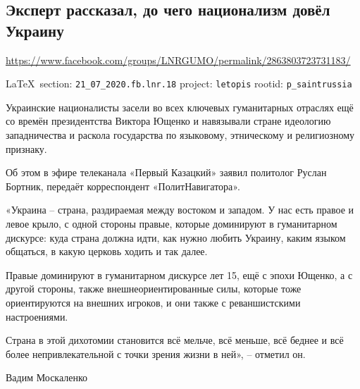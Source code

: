  
 
  
\subsection{Эксперт рассказал, до чего национализм довёл Украину}
\url{https://www.facebook.com/groups/LNRGUMO/permalink/2863803723731183/}

\vspace{0.5cm}
{\small\LaTeX~section: \verb|21_07_2020.fb.lnr.18| project: \verb|letopis| rootid: \verb|p_saintrussia|}
\vspace{0.5cm}

Украинские националисты засели во всех ключевых гуманитарных отраслях ещё со
времён президентства Виктора Ющенко и навязывали стране идеологию западничества
и раскола государства по языковому, этническому и религиозному признаку.

Об этом в эфире телеканала «Первый Казацкий» заявил политолог Руслан Бортник,
передаёт корреспондент «ПолитНавигатора».

«Украина – страна, раздираемая между востоком и западом. У нас есть правое и
левое крыло, с одной стороны правые, которые доминируют в гуманитарном
дискурсе: куда страна должна идти, как нужно любить Украину, каким языком
общаться, в какую церковь ходить и так далее.

Правые доминируют в гуманитарном дискурсе лет 15, ещё с эпохи Ющенко, а с
другой стороны, также внешнеориентированные силы, которые тоже ориентируются на
внешних игроков, и они также с реваншистскими настроениями.

Страна в этой дихотомии становится всё мельче, всё меньше, всё беднее и всё
более непривлекательной с точки зрения жизни в ней», – отметил он.

Вадим Москаленко
